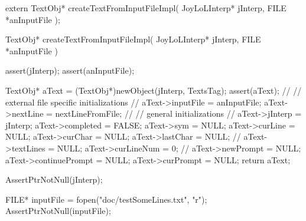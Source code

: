 \startCHeader
extern TextObj* createTextFromInputFileImpl(
  JoyLoLInterp* jInterp,
  FILE *anInputFile
);
\stopCHeader
{}

\startCCode
TextObj* createTextFromInputFileImpl(
  JoyLoLInterp* jInterp,
  FILE *anInputFile
) {
  assert(jInterp);
  assert(anInputFile);
  
  TextObj* aText = (TextObj*)newObject(jInterp, TextsTag);
  assert(aText);
  //
  // external file specific initializations
  //
  aText->inputFile  = anInputFile;
  aText->nextLine   = nextLineFromFile;
  //
  // general initializations
  //
  aText->jInterp    = jInterp;
  aText->completed  = FALSE;
  aText->sym        = NULL;
  aText->curLine    = NULL;
  aText->curChar    = NULL;
  aText->lastChar   = NULL;
  //
  aText->textLines  = NULL;
  aText->curLineNum = 0;
  //
  aText->newPrompt      = NULL;
  aText->continuePrompt = NULL;
  aText->curPrompt      = NULL;
  return aText;
}
\stopCCode

\startCTest
  AssertPtrNotNull(jInterp);

  FILE* inputFile = fopen("doc/testSomeLines.txt", "r");
  AssertPtrNotNull(inputFile);
  
